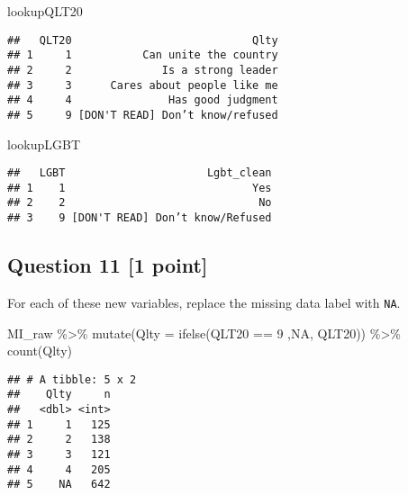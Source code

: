\documentclass[
]{article}
\newenvironment{Shaded}{\begin{snugshade}}{\end{snugshade}}
\newcommand{\AttributeTok}[1]{\textcolor[rgb]{0.77,0.63,0.00}{#1}}
\newcommand{\ConstantTok}[1]{\textcolor[rgb]{0.00,0.00,0.00}{#1}}
\newcommand{\DecValTok}[1]{\textcolor[rgb]{0.00,0.00,0.81}{#1}}
\newcommand{\FunctionTok}[1]{\textcolor[rgb]{0.00,0.00,0.00}{#1}}
\newcommand{\NormalTok}[1]{#1}
\newcommand{\SpecialCharTok}[1]{\textcolor[rgb]{0.00,0.00,0.00}{#1}}
\begin{document}
\begin{Shaded}
\begin{Highlighting}[]
\NormalTok{lookupQLT20}
\end{Highlighting}
\end{Shaded}

\begin{verbatim}
##   QLT20                            Qlty
## 1     1           Can unite the country
## 2     2              Is a strong leader
## 3     3      Cares about people like me
## 4     4               Has good judgment
## 5     9 [DON'T READ] Don’t know/refused
\end{verbatim}

\begin{Shaded}
\begin{Highlighting}[]
\NormalTok{lookupLGBT}
\end{Highlighting}
\end{Shaded}

\begin{verbatim}
##   LGBT                      Lgbt_clean
## 1    1                             Yes
## 2    2                              No
## 3    9 [DON'T READ] Don’t know/Refused
\end{verbatim}

\hypertarget{question-11-1-point}{%
\subsection{Question 11 {[}1 point{]}}\label{question-11-1-point}}

For each of these new variables, replace the missing data label with
\texttt{NA}.

\begin{Shaded}
\begin{Highlighting}[]
\NormalTok{MI\_raw }\SpecialCharTok{\%\textgreater{}\%}
  \FunctionTok{mutate}\NormalTok{(}\AttributeTok{Qlty =} \FunctionTok{ifelse}\NormalTok{(QLT20 }\SpecialCharTok{==} \DecValTok{9}\NormalTok{ ,}\ConstantTok{NA}\NormalTok{, QLT20)) }\SpecialCharTok{\%\textgreater{}\%}
  \FunctionTok{count}\NormalTok{(Qlty)}
\end{Highlighting}
\end{Shaded}

\begin{verbatim}
## # A tibble: 5 x 2
##    Qlty     n
##   <dbl> <int>
## 1     1   125
## 2     2   138
## 3     3   121
## 4     4   205
## 5    NA   642
\end{verbatim}
\end{document}
